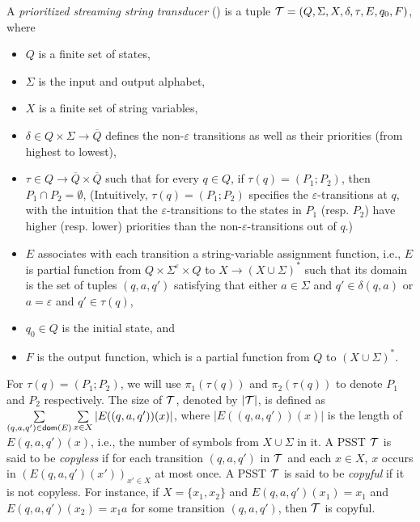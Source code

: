 \begin{definition}
A \emph{prioritized streaming string transducer} (\PSST) is a tuple $\mathcal{T} = (Q, \Sigma, X, \delta, \tau, E, q_0, F)$, where 
\begin{itemize}
\item $Q$ is a finite set of states, 
\item $\Sigma$ is the input and output alphabet, 
\item $X$ is a finite set of string variables, 
\item $\delta \in Q \times \Sigma \rightarrow \overline{Q}$ defines the non-$\varepsilon$ transitions as well as their priorities (from highest to lowest),
% 
\item $\tau \in Q \rightarrow \overline{Q} \times \overline{Q}$ such that for every $q \in Q$, if $\tau(q) = (P_1; P_2)$, then $P_1 \cap P_2 = \emptyset$, (Intuitively, $\tau(q)=(P_1; P_2)$ specifies the $\varepsilon$-transitions at $q$, with the intuition that the $\varepsilon$-transitions to the states in $P_1$ (resp. $P_2$) have higher (resp. lower) priorities than the non-$\varepsilon$-transitions out of $q$.)
\item $E$ associates with each transition a string-variable assignment function, i.e., $E$ is partial function from $Q \times \Sigma^\varepsilon \times
  Q$ to $X \rightarrow (X \cup \Sigma)^{\ast}$ such that its domain is the set of tuples $(q, a, q')$ satisfying that either $a \in \Sigma$ and $q' \in \delta(q, a)$ or $a = \varepsilon$ and $q' \in \tau(q)$,
\item  $q_0 \in Q$ is the initial state, and
\item  $F$ is the output function, which is a partial function from $Q$ to $(X \cup \Sigma)^{\ast}$.
\end{itemize}
\end{definition}
%
For $\tau(q)=(P_1; P_2)$, we will use $\pi_1(\tau(q))$ and $\pi_2(\tau(q))$ to denote $P_1$ and $P_2$ respectively.  
The size of $\mathcal{T}$, denoted by $|\mathcal{T}|$, is defined as $\sum \limits_{(q, a, q') \in \mathsf{dom}(E)} \sum \limits_{x \in X} |E((q, a, q'))(x)|$, where $|E((q, a, q'))(x)|$ is the length of $E(q, a, q')(x)$, i.e., the number of symbols from $X \cup \Sigma$ in it. A PSST $\mathcal{T} $ is said to be \emph{copyless} if for each transition $(q, a, q')$ in $\mathcal{T}$ and each $x \in X$, $x$ occurs in $(E(q, a, q')(x'))_{x' \in X}$ at most once. A PSST $\mathcal{T}$ is said to be \emph{copyful} if it is not copyless. For instance, if $X = \{x_1, x_2\}$ and $E(q, a, q')(x_1) = x_1$ and $E(q, a, q')(x_2) = x_1a$ for some transition $(q, a, q')$, then $\mathcal{T}$ is copyful. 

